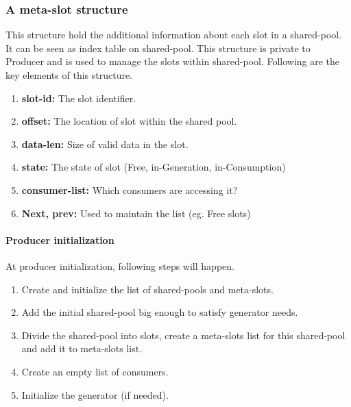 \documentclass[a4paper,twoside]{report} %
\begin{document}
\subsubsection{A meta-slot structure}
This structure hold the additional information about each slot in
a shared-pool.  It can be seen as index table on shared-pool.
This structure is private to Producer and is used to manage the
slots within shared-pool.  Following are the key elements of 
this structure.
\begin{enumerate} 
  \item \textbf{slot-id:} The slot identifier. 
  \item \textbf{offset:} The location of slot within the shared pool.
  \item \textbf{data-len:} Size of valid data in the slot.
  \item \textbf{state:} The state of slot (Free, in-Generation, 
  in-Consumption)
  \item \textbf{consumer-list:} Which consumers are accessing it? 
  \item \textbf{Next, prev:} Used to maintain the list (eg. Free slots)
\end{enumerate} 

\paragraph{Producer initialization}
At producer initialization, following steps will happen.
\begin{enumerate} 
  \item Create and initialize the list of shared-pools and meta-slots.
  \item Add the initial shared-pool big enough to satisfy generator
  needs.  
  \item Divide the shared-pool into slots, create a meta-slots list
  for this shared-pool and add it to meta-slots list.
  \item Create an empty list of consumers.
  \item Initialize the generator (if needed).
\end{enumerate} 
\end{document}
